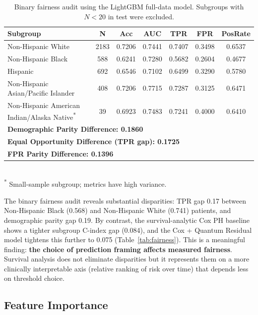 \documentclass[12pt, letterpaper]{article}
\begin{document}
\begin{table}[h!]
\centering
\caption{Binary fairness audit using the LightGBM full-data model. Subgroups with $N < 20$ in test were excluded.}
\label{tab:binary_fairness}
\begin{tabular}{@{}lcccccc@{}}
\toprule
\textbf{Subgroup} & \textbf{N} & \textbf{Acc} & \textbf{AUC} & \textbf{TPR} & \textbf{FPR} & \textbf{PosRate} \\
\midrule
Non-Hispanic White                          & 2183 & 0.7206 & 0.7441 & 0.7407 & 0.3498 & 0.6537 \\
Non-Hispanic Black                          & 588  & 0.6241 & 0.7280 & 0.5682 & 0.2604 & 0.4677 \\
Hispanic                                    & 692  & 0.6546 & 0.7102 & 0.6499 & 0.3290 & 0.5780 \\
Non-Hispanic Asian/Pacific Islander         & 408  & 0.7206 & 0.7715 & 0.7287 & 0.3125 & 0.6471 \\
Non-Hispanic American Indian/Alaska Native\textsuperscript{*} & 39 & 0.6923 & 0.7483 & 0.7241 & 0.4000 & 0.6410 \\
\midrule
\multicolumn{7}{l}{\small \textbf{Demographic Parity Difference: 0.1860}} \\
\multicolumn{7}{l}{\small \textbf{Equal Opportunity Difference (TPR gap): 0.1725}} \\
\multicolumn{7}{l}{\small \textbf{FPR Parity Difference: 0.1396}} \\
\bottomrule
\end{tabular}
\\[2pt]
\footnotesize\textsuperscript{*} Small-sample subgroup; metrics have high variance.
\end{table}

The binary fairness audit reveals substantial disparities: TPR gap 0.17 between Non-Hispanic Black (0.568) and Non-Hispanic White (0.741) patients, and demographic parity gap 0.19. By contrast, the survival-analytic Cox PH baseline shows a tighter subgroup C-index gap (0.084), and the Cox + Quantum Residual model tightens this further to 0.075 (Table~\ref{tab:fairness}). This is a meaningful finding: \textbf{the choice of prediction framing affects measured fairness}. Survival analysis does not eliminate disparities but it represents them on a more clinically interpretable axis (relative ranking of risk over time) that depends less on threshold choice.

\subsection{Feature Importance}
\end{document}

